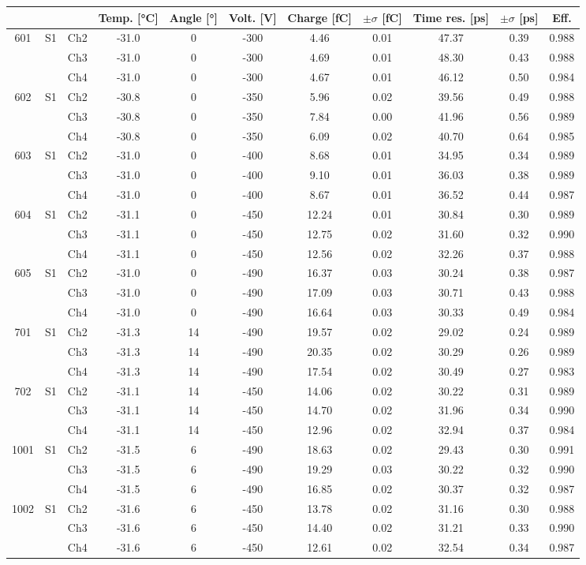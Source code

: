 \begin{tabular}{ccccccccccc}
\toprule
 &  &  & Temp. [°C] & Angle [°] & Volt. [V] & Charge [fC] & \(\pm\sigma\) [fC] & Time res. [ps] & \(\pm\sigma\) [ps] & Eff. \\
\midrule
601 & S1 & Ch2 & -31.0 & 0 & -300 & 4.46 & 0.01 & 47.37 & 0.39 & 0.988 \\
 &  & Ch3 & -31.0 & 0 & -300 & 4.69 & 0.01 & 48.30 & 0.43 & 0.988 \\
 &  & Ch4 & -31.0 & 0 & -300 & 4.67 & 0.01 & 46.12 & 0.50 & 0.984 \\
602 & S1 & Ch2 & -30.8 & 0 & -350 & 5.96 & 0.02 & 39.56 & 0.49 & 0.988 \\
 &  & Ch3 & -30.8 & 0 & -350 & 7.84 & 0.00 & 41.96 & 0.56 & 0.989 \\
 &  & Ch4 & -30.8 & 0 & -350 & 6.09 & 0.02 & 40.70 & 0.64 & 0.985 \\
603 & S1 & Ch2 & -31.0 & 0 & -400 & 8.68 & 0.01 & 34.95 & 0.34 & 0.989 \\
 &  & Ch3 & -31.0 & 0 & -400 & 9.10 & 0.01 & 36.03 & 0.38 & 0.989 \\
 &  & Ch4 & -31.0 & 0 & -400 & 8.67 & 0.01 & 36.52 & 0.44 & 0.987 \\
604 & S1 & Ch2 & -31.1 & 0 & -450 & 12.24 & 0.01 & 30.84 & 0.30 & 0.989 \\
 &  & Ch3 & -31.1 & 0 & -450 & 12.75 & 0.02 & 31.60 & 0.32 & 0.990 \\
 &  & Ch4 & -31.1 & 0 & -450 & 12.56 & 0.02 & 32.26 & 0.37 & 0.988 \\
605 & S1 & Ch2 & -31.0 & 0 & -490 & 16.37 & 0.03 & 30.24 & 0.38 & 0.987 \\
 &  & Ch3 & -31.0 & 0 & -490 & 17.09 & 0.03 & 30.71 & 0.43 & 0.988 \\
 &  & Ch4 & -31.0 & 0 & -490 & 16.64 & 0.03 & 30.33 & 0.49 & 0.984 \\
701 & S1 & Ch2 & -31.3 & 14 & -490 & 19.57 & 0.02 & 29.02 & 0.24 & 0.989 \\
 &  & Ch3 & -31.3 & 14 & -490 & 20.35 & 0.02 & 30.29 & 0.26 & 0.989 \\
 &  & Ch4 & -31.3 & 14 & -490 & 17.54 & 0.02 & 30.49 & 0.27 & 0.983 \\
702 & S1 & Ch2 & -31.1 & 14 & -450 & 14.06 & 0.02 & 30.22 & 0.31 & 0.989 \\
 &  & Ch3 & -31.1 & 14 & -450 & 14.70 & 0.02 & 31.96 & 0.34 & 0.990 \\
 &  & Ch4 & -31.1 & 14 & -450 & 12.96 & 0.02 & 32.94 & 0.37 & 0.984 \\
1001 & S1 & Ch2 & -31.5 & 6 & -490 & 18.63 & 0.02 & 29.43 & 0.30 & 0.991 \\
 &  & Ch3 & -31.5 & 6 & -490 & 19.29 & 0.03 & 30.22 & 0.32 & 0.990 \\
 &  & Ch4 & -31.5 & 6 & -490 & 16.85 & 0.02 & 30.37 & 0.32 & 0.987 \\
1002 & S1 & Ch2 & -31.6 & 6 & -450 & 13.78 & 0.02 & 31.16 & 0.30 & 0.988 \\
 &  & Ch3 & -31.6 & 6 & -450 & 14.40 & 0.02 & 31.21 & 0.33 & 0.990 \\
 &  & Ch4 & -31.6 & 6 & -450 & 12.61 & 0.02 & 32.54 & 0.34 & 0.987 \\
\bottomrule
\end{tabular}
